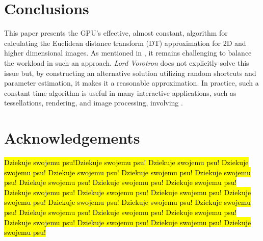 \documentclass{article}
\newcommand{\ourjfa}{Lord Vorotron} %
\begin{document}
\section{Conclusions} %

This paper presents the GPU's effective, almost constant, algorithm for calculating the Euclidean distance transform (DT) approximation for 2D and higher dimensional images.
%
As mentioned in \cite{cao2010parallel}, it remains challenging to balance the workload in such an approach.
%
\textit{\ourjfa} does not explicitly solve this issue but, by constructing an alternative solution utilizing random shortcuts and parameter estimation, it makes it a reasonable approximation.
%
In practice, such a constant time algorithm is useful in many interactive applications, such as tessellations, rendering, and image processing, involving \cite{rong2006jump}.

\section{Acknowledgements} %

\hl{Dziekuje swojemu psu!Dziekuje swojemu psu! Dziekuje swojemu psu! Dziekuje swojemu psu! Dziekuje swojemu psu! Dziekuje swojemu psu! Dziekuje swojemu psu! Dziekuje swojemu psu! Dziekuje swojemu psu! Dziekuje swojemu psu! Dziekuje swojemu psu! Dziekuje swojemu psu! Dziekuje swojemu psu! Dziekuje swojemu psu! Dziekuje swojemu psu! Dziekuje swojemu psu! Dziekuje swojemu psu! Dziekuje swojemu psu! Dziekuje swojemu psu! Dziekuje swojemu psu! Dziekuje swojemu psu! Dziekuje swojemu psu! Dziekuje swojemu psu! Dziekuje swojemu psu!  }


\printbibliography
\end{document}
